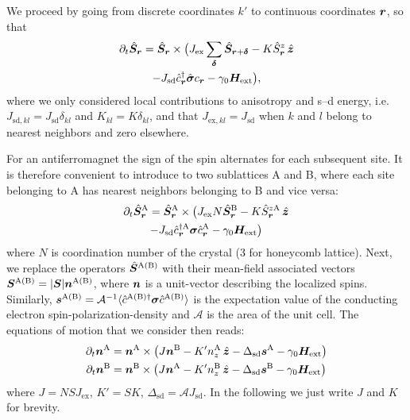 We proceed by going from discrete coordinates $k'$ to continuous coordinates $\boldsymbol{r}$, so that
\begin{multline}
    \partial_t \hat{\boldsymbol{S}}_{\boldsymbol{r}} =
        \hat{\boldsymbol{S}}_{\boldsymbol{r}}\times 
            \big (
                J_\text{ex}\sum_{\boldsymbol{\delta}}\hat{\boldsymbol{S}}_{\boldsymbol{r}+\boldsymbol{\delta}} - K\hat{S}^z_{\boldsymbol{r}}\,\hat{\boldsymbol{z}}\\-J_\text{sd} \hat{c}^\dagger_{\boldsymbol{r}}\hat{\boldsymbol{\sigma}}c_{\boldsymbol{r}}
                -\gamma_0 \boldsymbol{H}_\text{ext}
            \big ),
\end{multline}
where we only considered local contributions to anisotropy and s--d energy, i.e. $J_{\text{sd},kl}=J_\text{sd}\delta_{kl}$ and $K_{kl}=K\delta_{kl}$, and that $J_{\text{ex},kl}=J_\text{sd}$ when $k$ and $l$ belong to nearest neighbors and zero elsewhere. 

For an antiferromagnet the sign of the spin alternates for each subsequent site. It is therefore convenient to introduce to two sublattices A and B, where each site belonging to A has nearest neighbors belonging to B and vice versa:
\begin{multline}
    \partial_t \hat{\boldsymbol{S}}_{\boldsymbol{r}}^\text{A} =
        \hat{\boldsymbol{S}}_{\boldsymbol{r}}^\text{A}\times 
            \big (
                J_\text{ex}N\hat{\boldsymbol{S}}_{\boldsymbol{r}}^\text{B} - K\hat{S}^{z\text{A}}_{\boldsymbol{r}}\,\hat{\boldsymbol{z}}\\-J_\text{sd} \hat{c}_{\boldsymbol{r}}^{\dagger \text{A}}\boldsymbol{\sigma}\hat{c}_{\boldsymbol{r}}^{\text{A}}
                -\gamma_0 \boldsymbol{H}_\text{ext}
            \big ) \label{intro:eq:dsa}
\end{multline}
where $N$ is coordination number of the crystal (3 for honeycomb lattice). Next, we replace the operators $\hat{\boldsymbol{S}}^\text{A(B)}$ with their mean-field associated vectors $\boldsymbol{S}^\text{A(B)}  =|\boldsymbol{S}|\boldsymbol{n}^\text{A(B)}$, where $\boldsymbol{n}$ is a unit-vector describing the localized spins. Similarly, $\boldsymbol{s}^{\text{A(B)}}=\mathcal{A}^{-1}\langle \hat{c}^{\text{A(B)}\dagger}\boldsymbol{\sigma}\hat{c}^\text{A(B)}\rangle$ is the expectation value of the conducting electron spin-polarization-density and $\mathcal{A}$ is the area of the unit cell. The equations of motion that we consider then reads:
\begin{align}
    \partial_t \bb{n}^\text{A} &=
        \bb{{n}}^\text{A}\times 
            \big (
                J\bb{{n}}^\text{B} - K' n_z^{\text{A}}\,\hat{\bb{z}}-\Delta_\text{sd} \bb{s}^\text{A}
                -\gamma_0 \bb{H}_\text{ext}
            \big )\nonumber\\
    \partial_t \bb{n}^\text{B} &=
\bb{{n}}^\text{B}\times 
    \big (
        J\bb{{n}}^\text{A} - K'n_z^{\text{B}}\,\hat{\bb{z}}-\Delta_\text{sd} \bb{s}^\text{B}
        -\gamma_0 \bb{H}_\text{ext}
    \big )%
    \label{intro:eq:dsab}
\end{align}
where $J=NSJ_\text{ex}$, $K'=SK$, $\Delta_\text{sd}=\mathcal{A}J_\text{sd}$. In the following we just write $J$ and $K$ for brevity. 

